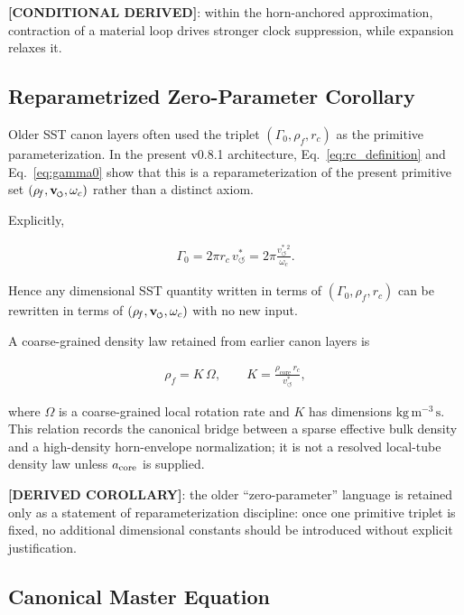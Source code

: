 \documentclass[11pt]{article}
\theoremstyle{definition}
\theoremstyle{plain}
\theoremstyle{remark}
\newcommand{\swirlarrow}{\mathchoice{\mkern-2mu\scriptstyle\boldsymbol{\circlearrowleft}}{\mkern-2mu\scriptstyle\boldsymbol{\circlearrowleft}}{\mkern-2mu\scriptscriptstyle\boldsymbol{\circlearrowleft}}{\mkern-2mu\scriptscriptstyle\boldsymbol{\circlearrowleft}}}
\newcommand{\vswirl}{\mathbf{v}_{\swirlarrow}}
\newcommand{\rhoF}{{\rho_{\!f}}}
\newcommand{\rhocore}{\rho_{\mathrm{core}}}
\newcommand{\rc}{{r_c}}
\newcommand{\vchar}{v_{\!\boldsymbol{\circlearrowleft}}^{\ast}}
\begin{document}
        \textbf{[CONDITIONAL DERIVED]}: within the horn-anchored approximation, contraction of a material loop drives stronger clock suppression, while expansion relaxes it.

    \subsection{Reparametrized Zero-Parameter Corollary}
        \label{subsec:zero_parameter_corollary}

        Older SST canon layers often used the triplet $(\Gamma_0,\rhoF,\rc)$ as the primitive parameterization. In the present v0.8.1 architecture, Eq.~\eqref{eq:rc_definition} and Eq.~\eqref{eq:gamma0} show that this is a reparameterization of the present primitive set $(\rhoF,\vswirl,\omega_c)$ rather than a distinct axiom.

        Explicitly,

        \begin{align}
            \Gamma_0 = 2\pi \rc \, \vchar
            = 2\pi \frac{\vchar^2}{\omega_c}.
            \label{eq:gamma0_reparam}
        \end{align}

        Hence any dimensional SST quantity written in terms of $(\Gamma_0,\rhoF,\rc)$ can be rewritten in terms of $(\rhoF,\vswirl,\omega_c)$ with no new input.

        A coarse-grained density law retained from earlier canon layers is

        \begin{align}
            \rhoF = K\,\Omega,
            \qquad
            K = \frac{\rhocore \, \rc}{\vchar},
            \label{eq:coarse_grain_density}
        \end{align}

        where $\Omega$ is a coarse-grained local rotation rate and $K$ has dimensions $\mathrm{kg\,m^{-3}\,s}$. This relation records the canonical bridge between a sparse effective bulk density and a high-density horn-envelope normalization; it is not a resolved local-tube density law unless $a_{\rm core}$ is supplied.

        \textbf{[DERIVED COROLLARY]}: the older ``zero-parameter'' language is retained only as a statement of reparameterization discipline: once one primitive triplet is fixed, no additional dimensional constants should be introduced without explicit justification.

    \subsection{Canonical Master Equation}
    \label{sec:master-equation}
\end{document}
